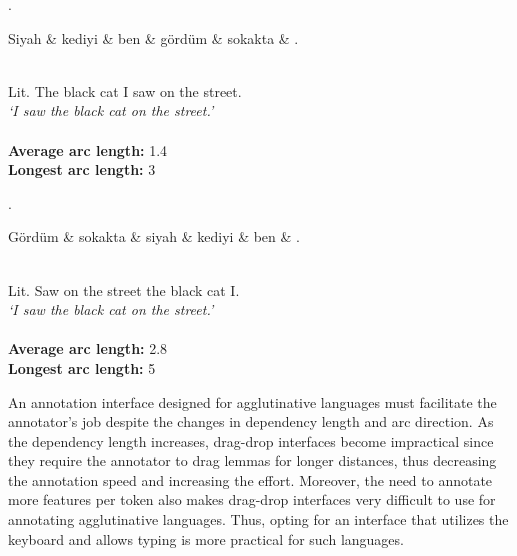 \begin{multicols}{2}
\vspace*{\fill} 
\ex. \label{dep1}
\begin{dependency}
   \begin{deptext}
      Siyah \& kediyi \& ben \& gördüm \& sokakta \& . \\
   \end{deptext}
\end{dependency} \\
Lit. The black cat I saw on the street. \\
\textit{‘I saw the black cat on the street.’} \\
\vspace{.05cm} \\
\textbf{Average arc length:} 1.4\\
\textbf{Longest arc length:} 3\\
\columnbreak

\ex. \label{dep2}
\begin{dependency}
   \begin{deptext}
      Gördüm \& sokakta \& siyah \& kediyi \& ben \& . \\
   \end{deptext}
\end{dependency} \\
Lit. Saw on the street the black cat I. \\
\textit{‘I saw the black cat on the street.’} \\
\vspace{.05cm} \\
\textbf{Average arc length:} 2.8\\
\textbf{Longest arc length:} 5

\end{multicols}

An annotation interface designed for agglutinative languages must facilitate the annotator's job despite the changes in dependency length and arc direction.
As the dependency length increases, drag-drop interfaces become impractical since they require the annotator to drag lemmas for longer distances, thus decreasing the annotation speed and increasing the effort.
Moreover, the need to annotate more features per token also makes drag-drop interfaces very difficult to use for annotating agglutinative languages.
Thus, opting for an interface that utilizes the keyboard and allows typing is more practical for such languages.

